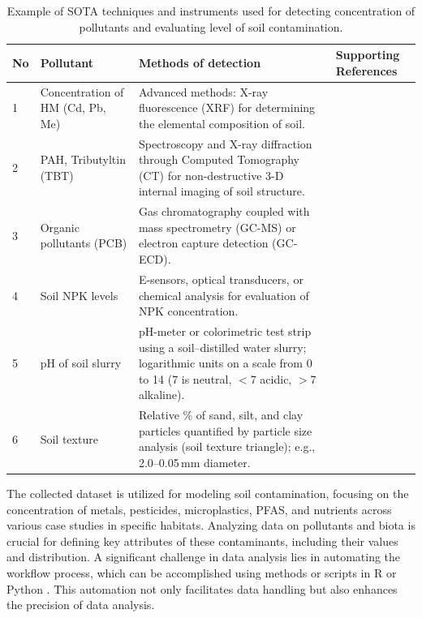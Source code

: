 \documentclass[sn-mathphys-num]{sn-jnl}
\begin{document}
\begin{table}[htbp]
\caption{Example of SOTA techniques and instruments used for detecting
    concentration of pollutants and evaluating level of soil
    contamination.}\label{tab1}
\begin{tabularx}{\textwidth}{@{} p{1.0cm} p{2.0cm} p{5.0cm} X @{}}
\toprule
\textbf{No} & \textbf{Pollutant} & \textbf{Methods of detection}
    & \textbf{Supporting References} \\
\midrule
1 & Concentration of HM (Cd, Pb, Me)
    & Advanced methods: X-ray fluorescence (XRF) for determining the
      elemental composition of soil.
    & \cite{Lu2023,LindhLemenkova2023b,Wan2019,Mukhopadhyay2020,Adewumi2024,Feng2024,Hu2020,Li2019} \\[4pt]
2 & PAH, Tributyltin (TBT)
    & Spectroscopy and X-ray diffraction through Computed Tomography (CT)
      for non-destructive 3-D internal imaging of soil structure.
    & \cite{LindhLemenkova2022d,Deceuster2012,Racic2025,LindhLemenkova2022a,Xu2026,Stojic2019} \\[4pt]
3 & Organic pollutants (PCB)
    & Gas chromatography coupled with mass spectrometry (GC-MS) or electron
      capture detection (GC-ECD).
    & \cite{Bustamante2025,Anagnostou2025,Sandu2025,Shen2024,Appel2022,Arnesdotter2025} \\[4pt]
4 & Soil NPK levels
    & E-sensors, optical transducers, or chemical analysis for evaluation of
      NPK concentration.
    & \cite{Hossain2024,Pal2024,Ma2024,Guan2024,Atoloye2024,Luo2017} \\[4pt]
5 & pH of soil slurry
    & pH-meter or colorimetric test strip using a soil--distilled water
      slurry; logarithmic units on a scale from 0 to 14 (7 is neutral,
      $<$7 acidic, $>$7 alkaline).
    & \cite{Zireeni2023,LindhLemenkova2022b,Rahman2014,Hepperly2009,LindhLemenkova2023c,Guo2021} \\[4pt]
6 & Soil texture
    & Relative \% of sand, silt, and clay particles quantified by particle
      size analysis (soil texture triangle); e.g., 2.0--0.05\,mm diameter.
    & \cite{Polakowski2023,LindhLemenkova2023d,Mozaffari2026,LindhLemenkova2023a,LindhLemenkova2023e,Jing2023,Wang2022} \\
\bottomrule
\end{tabularx}
\end{table}

The collected dataset is utilized for modeling soil contamination, focusing on
the concentration of metals, pesticides, microplastics, PFAS, and nutrients
across various case studies in specific habitats. Analyzing data on pollutants
and biota is crucial for defining key attributes of these contaminants,
including their values and distribution. A significant challenge in data
analysis lies in automating the workflow process, which can be accomplished
using methods or scripts in R or Python
\cite{Olah2025,Lemenkova2022,Wang2024b}. This automation not only facilitates
data handling but also enhances the precision of data analysis.
\end{document}
